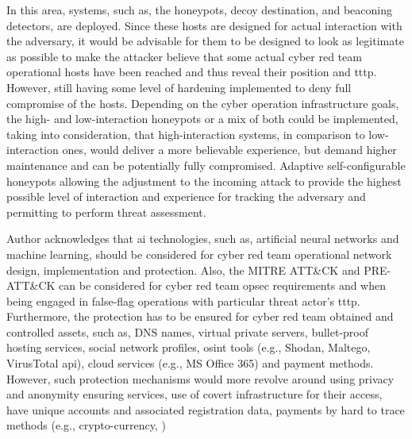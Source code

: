\begin{enumerate}
    In this area, systems, such as, the honeypots, decoy destination, and beaconing detectors, are deployed. Since these hosts are designed for actual interaction with the adversary, it would be advisable for them to be designed to look as legitimate as possible to make the attacker believe that some actual cyber red team operational hosts have been reached and thus reveal their position and \gls{tttp}. However, still having some level of hardening implemented to deny full compromise of the hosts. Depending on the cyber operation infrastructure goals, the high- and low-interaction honeypots or a mix of both could be implemented, taking into consideration, that high-interaction systems, in comparison to low-interaction ones, would deliver a more believable experience, but demand higher maintenance and can be potentially fully compromised. Adaptive self-configurable honeypots \cite{Wagener2011} \cite{Zhang2017} allowing the adjustment to the incoming attack to provide the highest possible level of interaction and experience for tracking the adversary and permitting to perform threat assessment.
\end{enumerate}
Author acknowledges that \gls{ai} technologies, such as, artificial neural networks and machine learning, should be considered for cyber red team operational network design, implementation and protection.
Also, the MITRE ATT\&CK and PRE-ATT\&CK \cite{MITRE-ATTACK} can be considered for cyber red team \gls{opsec} requirements and when being engaged in false-flag operations with particular threat actor's \gls{tttp}.
Furthermore, the protection has to be ensured for cyber red team obtained and controlled assets, such as, DNS names, virtual private servers, bullet-proof hosting services, social network profiles, \gls{osint} tools (e.g., Shodan, Maltego, VirusTotal \gls{api}), cloud services (e.g., MS Office 365) and payment methods. However, such protection mechanisms would more revolve around using privacy and anonymity ensuring services, use of covert infrastructure for their access, have unique accounts and associated registration data, payments by hard to trace methods (e.g., crypto-currency, )

